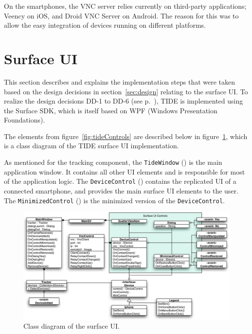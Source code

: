 On the smartphones, the VNC server relies currently on third-party applications; Veency on iOS, and Droid VNC Server on Android.
The reason for this was to allow the easy integration of devices running on different platforms.



\section{Surface UI}
\label{sec:surfaceui}

This section describes and explains the implementation steps that were taken based on the design decisions in section~\ref{sec:design} relating to the surface UI.
To realize the design decisions DD-1 to DD-6 (see p.~\pageref{DD}), TIDE is implemented using the Surface SDK, which is itself based on WPF (Windows Presentation Foundations).

The elements from figure~\ref{fig:tideControls} are described below in figure~\ref{fig:surfaceDiagram}, which is a class diagram of the TIDE surface UI implementation.

As mentioned for the tracking component, the \texttt{TideWindow} () is the main application window.
It contains all other UI elements and is responsible for most of the application logic.
The \texttt{DeviceControl} () contains the replicated UI of a connected smartphone, and provides the main surface UI elements to the user.
The \texttt{MinimizedControl} () is the minimized version of the \texttt{DeviceControl}.

\begin{figure}[htb]
  \centering
    \includegraphics[width=1\textwidth]{images/surfaceDiagram}
    \caption{Class diagram of the surface UI.}
    \label{fig:surfaceDiagram}
\end{figure}

